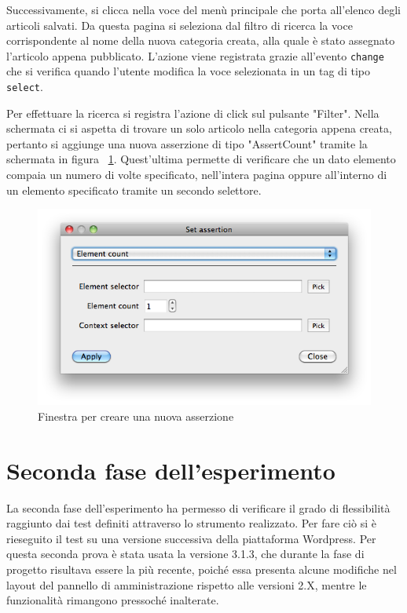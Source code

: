 Successivamente, si clicca nella voce del menù principale che porta all'elenco degli articoli salvati. Da questa pagina si seleziona dal filtro di ricerca la voce corrispondente al nome della nuova categoria creata, alla quale è stato assegnato l'articolo appena pubblicato. L'azione viene registrata grazie all'evento \verb|change| che si verifica quando l'utente modifica la voce selezionata in un tag di tipo \verb|select|. 

Per effettuare la ricerca si registra l'azione di click sul pulsante "Filter". Nella schermata ci si aspetta di trovare un solo articolo nella categoria appena creata, pertanto si aggiunge una nuova asserzione di tipo "AssertCount" tramite la schermata in figura ~\ref{fig:assertCountDialog}. Quest'ultima permette di verificare che un dato elemento compaia un numero di volte specificato, nell'intera pagina oppure all'interno di un elemento specificato tramite un secondo selettore.

\begin{figure}[htbp]
\begin{center}
\includegraphics[width=\textwidth]{images/wp_tour/9_count_dialog.png}
\caption{Finestra per creare una nuova asserzione}
\label{fig:assertCountDialog}
\end{center}
\end{figure}

\section{Seconda fase dell'esperimento}

La seconda fase dell'esperimento ha permesso di verificare il grado di flessibilità raggiunto dai test definiti attraverso lo strumento realizzato. Per fare ciò si è rieseguito il test su una versione successiva della piattaforma Wordpress. Per questa seconda prova è stata usata la versione 3.1.3, che durante la fase di progetto risultava essere la più recente, poiché essa presenta alcune modifiche nel layout del pannello di amministrazione rispetto alle versioni 2.X, mentre le funzionalità rimangono pressoché inalterate.

